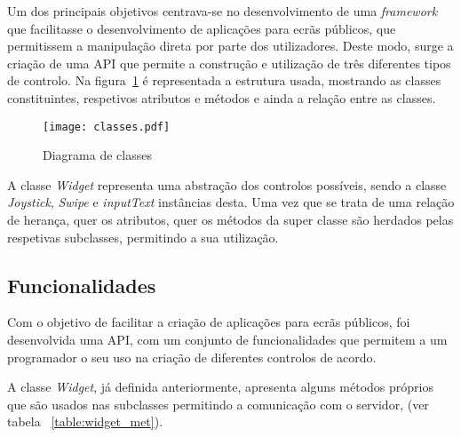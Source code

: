 Um dos principais objetivos centrava-se no desenvolvimento de uma \textit{framework} que facilitasse o desenvolvimento de aplicações para ecrãs públicos, que permitissem a manipulação direta por parte dos utilizadores. Deste modo, surge a criação de uma API que permite a construção e utilização de três diferentes tipos de controlo. 
Na figura~\ref{fig:classes} é representada a estrutura usada, mostrando as classes constituintes, respetivos atributos e métodos e ainda a relação entre as classes.

\begin{figure}[ht]
\centering
\texttt{[image: classes.pdf]}
\caption[Diagrama de Classes] {Diagrama de classes}
\label{fig:classes}
\end{figure}

A classe \textit{Widget} representa uma abstração dos controlos possíveis, sendo a classe \textit{Joystick}, \textit{Swipe} e \textit{inputText} instâncias desta. Uma vez que se trata de uma relação de herança, quer os atributos, quer os métodos da super classe são herdados pelas respetivas subclasses, permitindo a sua utilização.

\subsection{Funcionalidades}

	Com o objetivo de facilitar a criação de aplicações para ecrãs públicos, foi desenvolvida uma API, com um conjunto de funcionalidades que permitem a um programador o seu uso na criação de diferentes controlos de acordo.

	A classe \textit{Widget}, já definida anteriormente, apresenta alguns métodos próprios que são usados nas subclasses permitindo a comunicação com o servidor, (ver tabela ~\ref{table:widget_met}).

